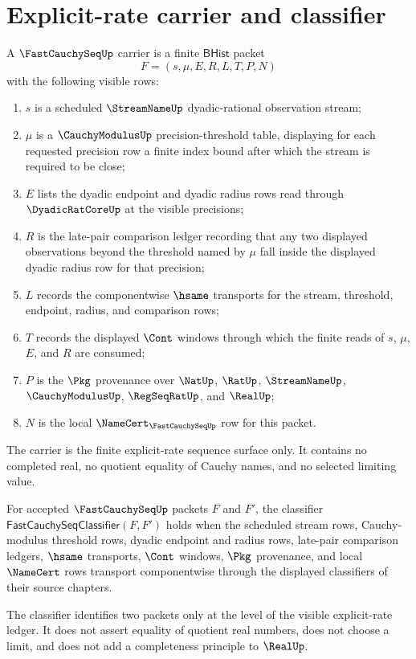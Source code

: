 \section{Explicit-rate carrier and classifier}
\label{sec:fastcauchyseq-explicit-rate-carrier}

\begin{definition}
\label{def:fastcauchyseq-carrier}
A $\FastCauchySeqUp$ carrier is a finite $\mathsf{BHist}$ packet
$$
F=(s,\mu,E,R,L,T,P,N)
$$
with the following visible rows:
\begin{enumerate}
\item $s$ is a scheduled $\StreamNameUp$ dyadic-rational observation stream;
\item $\mu$ is a $\CauchyModulusUp$ precision-threshold table, displaying for each requested precision row a finite index bound after which the stream is required to be close;
\item $E$ lists the dyadic endpoint and dyadic radius rows read through $\DyadicRatCoreUp$ at the visible precisions;
\item $R$ is the late-pair comparison ledger recording that any two displayed observations beyond the threshold named by $\mu$ fall inside the displayed dyadic radius row for that precision;
\item $L$ records the componentwise $\hsame$ transports for the stream, threshold, endpoint, radius, and comparison rows;
\item $T$ records the displayed $\Cont$ windows through which the finite reads of $s$, $\mu$, $E$, and $R$ are consumed;
\item $P$ is the $\Pkg$ provenance over $\NatUp$, $\RatUp$, $\StreamNameUp$, $\CauchyModulusUp$, $\RegSeqRatUp$, and $\RealUp$;
\item $N$ is the local $\NameCert_{\FastCauchySeqUp}$ row for this packet.
\end{enumerate}
The carrier is the finite explicit-rate sequence surface only. It contains no completed real, no quotient equality of Cauchy names, and no selected limiting value.
\end{definition}

\begin{definition}
\label{def:fastcauchyseq-classifier}
For accepted $\FastCauchySeqUp$ packets $F$ and $F'$, the classifier $\mathsf{FastCauchySeqClassifier}(F,F')$ holds when the scheduled stream rows, Cauchy-modulus threshold rows, dyadic endpoint and radius rows, late-pair comparison ledgers, $\hsame$ transports, $\Cont$ windows, $\Pkg$ provenance, and local $\NameCert$ rows transport componentwise through the displayed classifiers of their source chapters.

The classifier identifies two packets only at the level of the visible explicit-rate ledger. It does not assert equality of quotient real numbers, does not choose a limit, and does not add a completeness principle to $\RealUp$.
\end{definition}

